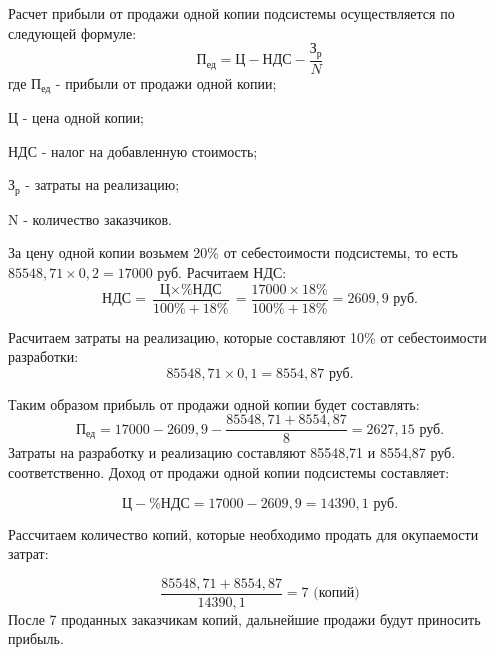 \documentclass[a4paper]{extarticle}
\numberwithin{equation}{section}
\begin{document}
Расчет прибыли от продажи одной копии подсистемы осуществляется по следующей формуле:
\begin{equation}
\label{form13}
	\text{П}_\text{ед}=\text{Ц}-\text{НДС}-\frac{\text{З}_\text{р}}{N}
\end{equation}
где $\text{П}_\text{ед}$ - прибыли от продажи одной копии;\par
$\text{Ц}$ - цена одной копии;\par
$\text{НДС}$ - налог на добавленную стоимость;\par
$\text{З}_\text{р}$ - затраты на реализацию;\par
N - количество заказчиков.\par
За цену одной копии возьмем 20\% от себестоимости подсистемы, то есть $85548,71\times 0,2 = 17000$ руб.
Расчитаем НДС:
\begin{equation}
\label{form14}
	\text{НДС}=\frac{\text{Ц}\times \text{\%НДС}}{100\%+18\%}=\frac{17000\times 18\%}{100\%+18\%}=2609,9 \text{ руб.}
\end{equation}\par
Расчитаем затраты на реализацию, которые составляют 10\% от себестоимости разработки:
\begin{equation}
\label{form15}
	85548,71\times 0,1 = 8554,87 \text{ руб.}
\end{equation}\par
Таким образом прибыль от продажи одной копии будет составлять:
\begin{equation}
\label{form16}
	\text{П}_\text{ед}=17000-2609,9-\frac{85548,71+8554,87}{8}=2627,15\text{ руб.}
\end{equation}
Затраты на разработку и реализацию составляют 85548,71 и 8554,87 руб. соответственно. Доход от продажи одной копии подсистемы составляет:\par
\begin{equation}
\label{form17}
	\text{Ц}-\text{\%НДС} = 17000-2609,9 = 14390,1 \text{ руб.}
\end{equation}\par
Рассчитаем количество копий, которые необходимо продать для окупаемости затрат:\par
\begin{equation}
\label{form18}
	\frac{85548,71+8554,87}{14390,1}=7 \text{ (копий)}
\end{equation}
После 7 проданных заказчикам копий, дальнейшие продажи будут приносить прибыль.
\end{document}
